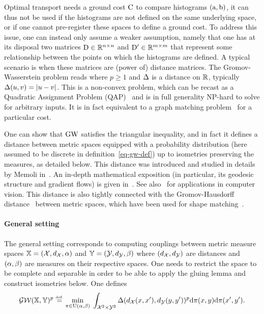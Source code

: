Optimal transport needs a ground cost $\mathrm{C}$ to compare histograms $(\mathrm{a},\mathrm{b})$, it can thus not be used if the histograms are not defined on the same underlying space, or if one cannot pre-register these spaces to define a ground cost. 
%
To address this issue, one can instead only assume a weaker assumption, namely that one has at its disposal two matrices $\mathrm{D} \in \mathbb{R}^{n \times n}$ and $\mathrm{D}' \in \mathbb{R}^{m \times m}$ that represent some relationship between the points on which the histograms are defined. A typical scenario is when these matrices are (power of) distance matrices.
%
The Gromov-Wasserstein problem reads
where $p \geq 1$ and $\Delta$ is a distance on $\mathbb{R}$, typically $\Delta(u,v)=|u-v|$.
%
This is a non-convex problem, which can be recast as a Quadratic Assignment Problem (QAP)~\cite{loiola-2007} and is in full generality NP-hard to solve for arbitrary inputs. 
%
It is in fact equivalent to a graph matching problem~\cite{lyzinski-2015} for a particular cost.

One can show that $\operatorname{\mathrm{GW}}$ satisfies the triangular inequality, and in fact it defines a distance between metric spaces equipped with a probability distribution (here assumed to be discrete in definition~\eqref{eq-gw-def}) up to isometries preserving the measures, as detailed below.
%
This distance was introduced and studied in details by Memoli in~\cite{memoli-2011}. An in-depth mathematical exposition (in particular, its geodesic structure and gradient flows) is given in~\cite{SturmGW}. See also~\cite{schmitzer2013modelling} for applications in computer vision.
%
This distance is also tightly connected with the Gromov-Hausdorff distance~\cite{gromov-2001} between metric spaces, which have been used for shape matching~\cite{memoli-2007,bronstein-2010}. 


\paragraph{General setting} 

The general setting corresponds to computing couplings between metric measure spaces $\mathbb{X}=(\mathcal{X},d_{\mathcal{X}},\alpha)$
	and $\mathbb{Y}=(\mathcal{Y},d_{\mathcal{Y}},\beta)$ where $(d_{\mathcal{X}},d_{\mathcal{Y}})$ are distances and $(\alpha,\beta)$ are measures on their respective spaces.
	One needs to restrict the space to be complete and separable in order to be able to apply the gluing lemma and construct isometries below.
	One defines 
	\begin{align}
		\label{eq-gw-generic}
		\operatorname{\mathcal{GW}}( \mathbb{X},\mathbb{Y} )^p \stackrel{\mbox{\upshape\tiny def.}}{=} 
		\underset{ \pi \in \mathrm{U}(\alpha,\beta) }{\min}\; 
		\int_{\mathcal{X}^2 \times \mathcal{Y}^2}
		 \Delta(d_{\mathcal{X}}(x,x'),d_{\mathcal{Y}}(y,y'))^p
		\mathrm{d}\pi(x,y)\mathrm{d}\pi(x',y').
	\end{align}
 
